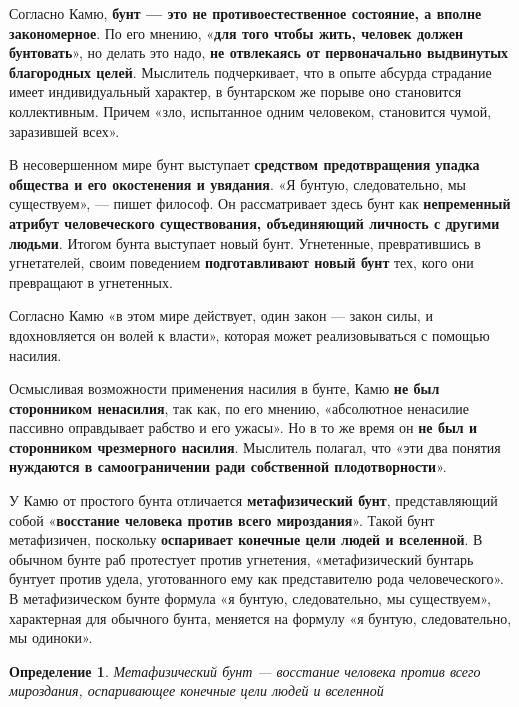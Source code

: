 \documentclass{article}
\newtheorem{definition}{Определение}
\begin{document}
\begin{flushleft}
\hfill

Согласно Камю, \textbf{бунт — это не противоестественное состояние, а вполне закономерное}. По его мнению, «\textbf{для того чтобы жить, человек должен бунтовать}», но делать это надо, \textbf{не отвлекаясь от первоначально выдвинутых благородных целей}. Мыслитель подчеркивает, что в опыте абсурда страдание имеет индивидуальный характер, в бунтарском же порыве оно становится коллективным. Причем «зло, испытанное одним человеком, становится чумой, заразившей всех».

\hfill

В несовершенном мире бунт выступает \textbf{средством предотвращения упадка общества и его окостенения и увядания}. «Я бунтую, следовательно, мы существуем», — пишет философ. Он рассматривает здесь бунт как \textbf{непременный атрибут человеческого существования, объединяющий личность с другими людьми}. Итогом бунта выступает новый бунт. Угнетенные, превратившись в угнетателей, своим поведением \textbf{подготавливают новый бунт} тех, кого они превращают в угнетенных.

\hfill

Согласно Камю «в этом мире действует, один закон — закон силы, и вдохновляется он волей к власти», которая может реализовываться с помощью насилия.

\hfill

Осмысливая возможности применения насилия в бунте, Камю \textbf{не был сторонником ненасилия}, так как, по его мнению, «абсолютное ненасилие пассивно оправдывает рабство и его ужасы». Но в то же время он \textbf{не был и сторонником чрезмерного насилия}. Мыслитель полагал, что «эти два понятия \textbf{нуждаются в самоограничении ради собственной плодотворности}».

\hfill

У Камю от простого бунта отличается \textbf{метафизический бунт}, представляющий собой «\textbf{восстание человека против всего мироздания}». Такой бунт метафизичен, поскольку \textbf{оспаривает конечные цели людей и вселенной}. В обычном бунте раб протестует против угнетения, «метафизический бунтарь бунтует против удела, уготованного ему как представителю рода человеческого». В метафизическом бунте формула «я бунтую, следовательно, мы существуем», характерная для обычного бунта, меняется на формулу «я бунтую, следовательно, мы одиноки».

\begin{definition}
    Метафизический бунт — восстание человека против всего мироздания, оспаривающее конечные цели людей и вселенной
\end{definition}


\end{flushleft}
\end{document}
